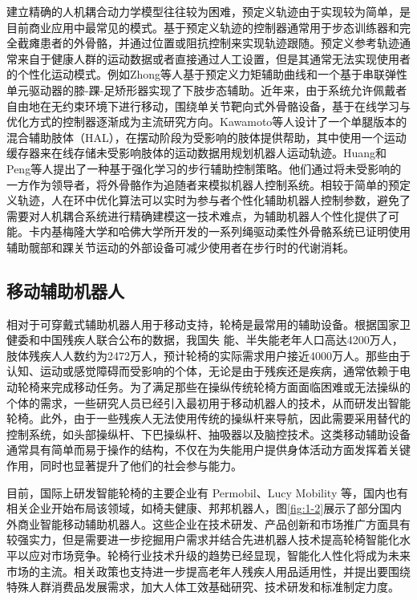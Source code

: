 建立精确的人机耦合动力学模型往往较为困难，预定义轨迹由于实现较为简单，是目前商业应用中最常见的模式。基于预定义轨迹的控制器通常用于步态训练器和完全截瘫患者的外骨骼，并通过位置或阻抗控制来实现轨迹跟随。预定义参考轨迹通常来自于健康人群的运动数据或者直接通过人工设置，但是其通常无法实现使用者的个性化运动模式。例如Zhong等人\cite{zhongGaitSymmetryEnhancement2022}基于预定义力矩辅助曲线和一个基于串联弹性单元驱动器的膝-踝-足矫形器实现了下肢步态辅助。近年来，由于系统允许佩戴者自由地在无约束环境下进行移动，围绕单关节靶向式外骨骼设备，基于在线学习与优化方式的控制器逐渐成为主流研究方向。Kawamoto等人\cite{kawamotoModificationHemiplegicCompensatory2015,kawamotoDevelopmentAssistController2014a}设计了一个单腿版本的混合辅助肢体（HAL），在摆动阶段为受影响的肢体提供帮助，其中使用一个运动缓存器来在线存储未受影响肢体的运动数据用规划机器人运动轨迹。Huang和Peng等人\cite{huangLearningbasedWalkingAssistance2018,pengDataDrivenReinforcementLearning2020}提出了一种基于强化学习的步行辅助控制策略。他们通过将未受影响的一方作为领导者，将外骨骼作为追随者来模拟机器人控制系统。相较于简单的预定义轨迹，人在环中优化算法可以实时为参与者个性化辅助机器人控制参数，避免了需要对人机耦合系统进行精确建模这一技术难点，为辅助机器人个性化提供了可能。卡内基梅隆大学和哈佛大学\cite{dingHumanintheloopOptimizationHip2018,zhangHumanintheloopOptimizationExoskeleton2017a,awadSoftRoboticExosuit2017}所开发的一系列绳驱动柔性外骨骼系统已证明使用辅助髋部和踝关节运动的外部设备可减少使用者在步行时的代谢消耗。

\subsection{移动辅助机器人}
相对于可穿戴式辅助机器人用于移动支持，轮椅是最常用的辅助设备\cite{worldhealthorganizationGuidelinesProvisionManual2008b}。根据国家卫健委和中国残疾人联合公布的数据，我国失
能、半失能老年人口高达4200万人，肢体残疾人人数约为2472万人，预计轮椅的实际需求用户接近4000万人。那些由于认知、运动或感觉障碍而受影响的个体，无论是由于残疾还是疾病，通常依赖于电动轮椅来完成移动任务。为了满足那些在操纵传统轮椅方面面临困难或无法操纵的个体的需求，一些研究人员已经引入最初用于移动机器人的技术，从而研发出智能轮椅。此外，由于一些残疾人无法使用传统的操纵杆来导航，因此需要采用替代的控制系统，如头部操纵杆、下巴操纵杆、抽吸器以及脑控技术\cite{kimLiteratureReviewSmart2023}。这类移动辅助设备通常具有简单而易于操作的结构，不仅在为失能用户提供身体活动方面发挥着关键作用，同时也显著提升了他们的社会参与能力。

目前，国际上研发智能轮椅的主要企业有 Permobil、Lucy Mobility 等，国内也有相关企业开始布局该领域，如椅夫健康、邦邦机器人，图\ref{fig:1-2}展示了部分国内外商业智能移动辅助机器人。这些企业在技术研发、产品创新和市场推广方面具有较强实力，但是需要进一步挖掘用户需求并结合先进机器人技术提高轮椅智能化水平以应对市场竞争。轮椅行业技术升级的趋势已经显现，智能化人性化将成为未来市场的主流。相关政策也支持进一步提高老年人残疾人用品适用性，并提出要围绕特殊人群消费品发展需求，加大人体工效基础研究、技术研发和标准制定力度。

